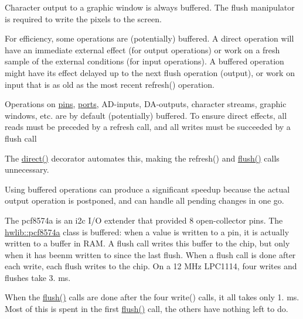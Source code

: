 Character output to a graphic window is always buffered. The flush manipulator is required to write the pixels to the screen.


\begin{DoxyCodeInclude}
\end{DoxyCodeInclude}
 For efficiency, some operations are (potentially) buffered. A direct operation will have an immediate external effect (for output operations) or work on a fresh sample of the external conditions (for input operations). A buffered operation might have its effect delayed up to the next flush operation (output), or work on input that is as old as the most recent refresh() operation.

Operations on \hyperlink{pins}{pins}, \hyperlink{ports}{ports}, A\+D-\/inputs, D\+A-\/outputs, character streams, graphic windows, etc. are by default (potentially) buffered. To ensure direct effects, all reads must be preceded by a refresh call, and all writes must be succeeded by a flush call


\begin{DoxyCodeInclude}
\end{DoxyCodeInclude}
 The \hyperlink{namespacehwlib_a43941b7f246ad934ee43dbfa0f5c8b5a}{direct()} decorator automates this, making the refresh() and \hyperlink{namespacehwlib_a648fe94ca9899747a632c23f97007732}{flush()} calls unnecessary.


\begin{DoxyCodeInclude}
\end{DoxyCodeInclude}
 Using buffered operations can produce a significant speedup because the actual output operation is postponed, and can handle all pending changes in one go.

The pcf8574a is an i2c I/O extender that provided 8 open-\/collector pins. The \hyperlink{namespacehwlib_a1de5a49c6b1b8cd371e5444684018976}{hwlib\+::pcf8574a} class is buffered\+: when a value is written to a pin, it is actually written to a buffer in R\+AM. A flush call writes this buffer to the chip, but only when it has beenm written to since the last flush. When a flush call is done after each write, each flush writes to the chip. On a 12 M\+Hz L\+P\+C1114, four writes and flushes take 3. ms.


\begin{DoxyCodeInclude}
\end{DoxyCodeInclude}
 When the \hyperlink{namespacehwlib_a648fe94ca9899747a632c23f97007732}{flush()} calls are done after the four write() calls, it all takes only 1. ms. Most of this is spent in the first \hyperlink{namespacehwlib_a648fe94ca9899747a632c23f97007732}{flush()} call, the others have nothing left to do.


\begin{DoxyCodeInclude}
\end{DoxyCodeInclude}
